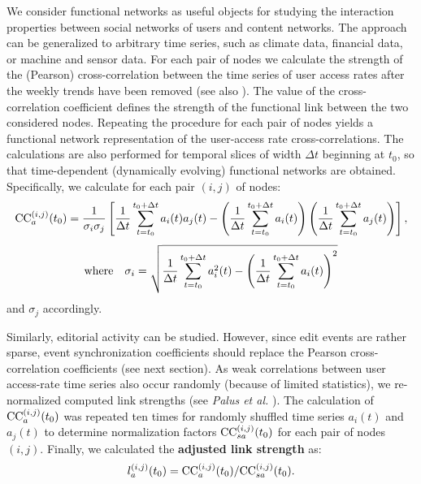 \documentclass[a4paper,10pt]{scrbook}
\begin{document}
We consider functional networks as useful objects for studying the interaction properties between social networks of users and content networks. The approach can be generalized to arbitrary time series, such as climate data, financial data, or machine and sensor data. For each pair of nodes we calculate the strength of the (Pearson) cross-correlation between the 
time series of user access rates after the weekly trends have been removed
(see also \cite{PHYSA.2012}). The value of the cross-correlation coefficient
defines the strength of the
functional link between the two considered nodes. Repeating the procedure for each 
pair of nodes yields a functional network representation of the user-access rate 
cross-correlations. The calculations are also performed for temporal slices of width 
$\Delta t$ beginning at $t_0$, so that time-dependent (dynamically evolving)
functional networks are obtained. Specifically, we calculate for each pair $(i,j)$ 
of nodes:
\begin{equation}
{\rm CC}_a^{(i,j)}(t_0) = {1 \over \sigma_i \sigma_j} \left[{1 \over \Delta t} 
\sum_{t=t_0}^{t_0+\Delta t} a_i(t) a_j(t) - \left({1 \over \Delta t}
\sum_{t=t_0}^{t_0+\Delta t} a_i(t)\right) \left({1 \over \Delta t}
\sum_{t=t_0}^{t_0+\Delta t} a_j(t)\right) \right], 
\label{EQ.FCC.PEARSON}
\end{equation} 
\begin{equation}
{\rm where} \quad \sigma_i = \sqrt{{1 \over \Delta t} \sum_{t=t_0}^{t_0+\Delta t} 
a^2_i(t) - \left({1 \over \Delta t}\sum_{t=t_0}^{t_0+\Delta t} a_i(t)\right)^2}
\end{equation} 
and $\sigma_j$ accordingly. 

Similarly, editorial activity can be studied. However, since edit events are
rather sparse, event synchronization coefficients \cite{Quiroga.2002} should
replace the Pearson cross-correlation coefficients (see next section). As weak correlations
between user access-rate time series also occur randomly (because of limited
statistics), we re-normalized computed link strengths (see \textit{Palus et al.} \cite{Palus2011}).
The calculation of ${\rm CC}_a^{(i,j)}(t_0)$ was
repeated ten times for randomly shuffled time series $a_i(t)$ and $a_j(t)$ to
determine normalization factors ${\rm CC}_{sa}^{(i,j)}(t_0)$ for each pair of
nodes $(i,j)$. Finally, we calculated the \textbf{adjusted link strength} as:
\begin{equation}
l_a^{(i,j)}(t_0) = {\rm CC}_a^{(i,j)}(t_0) / {\rm CC}_{sa}^{(i,j)}(t_0).
\end{equation} 
\end{document}
